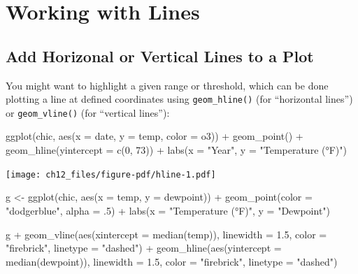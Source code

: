 \documentclass[
  letterpaper,
  DIV=11,
  numbers=noendperiod]{scrreprt}
\newenvironment{Shaded}{\begin{snugshade}}{\end{snugshade}}
\newcommand{\AttributeTok}[1]{\textcolor[rgb]{0.40,0.45,0.13}{#1}}
\newcommand{\DecValTok}[1]{\textcolor[rgb]{0.68,0.00,0.00}{#1}}
\newcommand{\FloatTok}[1]{\textcolor[rgb]{0.68,0.00,0.00}{#1}}
\newcommand{\FunctionTok}[1]{\textcolor[rgb]{0.28,0.35,0.67}{#1}}
\newcommand{\NormalTok}[1]{\textcolor[rgb]{0.00,0.23,0.31}{#1}}
\newcommand{\OtherTok}[1]{\textcolor[rgb]{0.00,0.23,0.31}{#1}}
\newcommand{\SpecialCharTok}[1]{\textcolor[rgb]{0.37,0.37,0.37}{#1}}
\newcommand{\StringTok}[1]{\textcolor[rgb]{0.13,0.47,0.30}{#1}}
\begin{document}

\chapter{Working with Lines}\label{lines}

\section{Add Horizonal or Vertical Lines to a
Plot}\label{add-horizonal-or-vertical-lines-to-a-plot}

You might want to highlight a given range or threshold, which can be
done plotting a line at defined coordinates using \texttt{geom\_hline()}
(for ``horizontal lines'') or \texttt{geom\_vline()} (for ``vertical
lines''):

\begin{Shaded}
\begin{Highlighting}[]
\FunctionTok{ggplot}\NormalTok{(chic, }\FunctionTok{aes}\NormalTok{(}\AttributeTok{x =}\NormalTok{ date, }\AttributeTok{y =}\NormalTok{ temp, }\AttributeTok{color =}\NormalTok{ o3)) }\SpecialCharTok{+}
  \FunctionTok{geom\_point}\NormalTok{() }\SpecialCharTok{+}
  \FunctionTok{geom\_hline}\NormalTok{(}\AttributeTok{yintercept =} \FunctionTok{c}\NormalTok{(}\DecValTok{0}\NormalTok{, }\DecValTok{73}\NormalTok{)) }\SpecialCharTok{+}
  \FunctionTok{labs}\NormalTok{(}\AttributeTok{x =} \StringTok{"Year"}\NormalTok{, }\AttributeTok{y =} \StringTok{"Temperature (°F)"}\NormalTok{)}
\end{Highlighting}
\end{Shaded}

\texttt{[image: ch12\_files/figure-pdf/hline-1.pdf]}

\begin{Shaded}
\begin{Highlighting}[]
\NormalTok{g }\OtherTok{\textless{}{-}} \FunctionTok{ggplot}\NormalTok{(chic, }\FunctionTok{aes}\NormalTok{(}\AttributeTok{x =}\NormalTok{ temp, }\AttributeTok{y =}\NormalTok{ dewpoint)) }\SpecialCharTok{+}
  \FunctionTok{geom\_point}\NormalTok{(}\AttributeTok{color =} \StringTok{"dodgerblue"}\NormalTok{, }\AttributeTok{alpha =}\NormalTok{ .}\DecValTok{5}\NormalTok{) }\SpecialCharTok{+}
  \FunctionTok{labs}\NormalTok{(}\AttributeTok{x =} \StringTok{"Temperature (°F)"}\NormalTok{, }\AttributeTok{y =} \StringTok{"Dewpoint"}\NormalTok{)}

\NormalTok{g }\SpecialCharTok{+}
  \FunctionTok{geom\_vline}\NormalTok{(}\FunctionTok{aes}\NormalTok{(}\AttributeTok{xintercept =} \FunctionTok{median}\NormalTok{(temp)), }\AttributeTok{linewidth =} \FloatTok{1.5}\NormalTok{,}
             \AttributeTok{color =} \StringTok{"firebrick"}\NormalTok{, }\AttributeTok{linetype =} \StringTok{"dashed"}\NormalTok{) }\SpecialCharTok{+}
  \FunctionTok{geom\_hline}\NormalTok{(}\FunctionTok{aes}\NormalTok{(}\AttributeTok{yintercept =} \FunctionTok{median}\NormalTok{(dewpoint)), }\AttributeTok{linewidth =} \FloatTok{1.5}\NormalTok{,}
             \AttributeTok{color =} \StringTok{"firebrick"}\NormalTok{, }\AttributeTok{linetype =} \StringTok{"dashed"}\NormalTok{)}
\end{Highlighting}
\end{Shaded}
\end{document}
